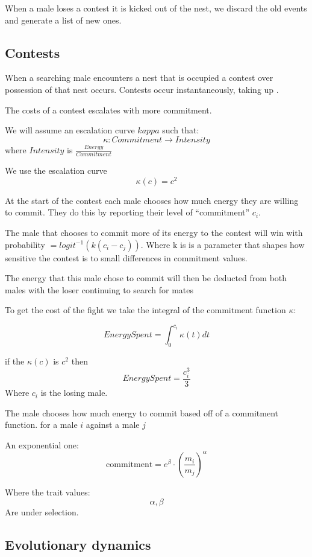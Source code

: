 \documentclass[a4paper,11pt]{article}
\begin{document}
When a male loses a contest it is kicked out of the nest, we discard the old events and generate a list of new ones.

\clearpage

\subsection{Contests}
When a searching male encounters a nest that is occupied a contest over possession of that nest occurs. Contests occur instantaneously, taking up .

The costs of a contest escalates with more commitment.

We will assume an escalation curve $kappa$ such that:
$$\kappa : Commitment \rightarrow Intensity$$
where $Intensity$ is $\frac{Energy}{Commitment}$

We use the escalation curve $$ \kappa (c) = c^2 $$

At the start of the contest each male chooses how much  energy they are willing to commit.
They do this by reporting their level of ``commitment'' $c_i$.

The male that chooses to commit more of its energy to the contest will win with probability $= logit^{-1}(k(c_i - c_j))$. Where k is is a parameter that shapes how sensitive the contest is to small differences in commitment values. 

The energy that this male chose to commit will then be deducted from both males with the loser continuing to search for mates

To get the cost of the fight we take the integral of the commitment function $\kappa$:

$$Energy Spent = \int_0^{c_i}{\kappa(t)}dt $$

if the $\kappa(c)$ is $c^2$ then
$$EnergySpent = \frac{c_i^3}{3}$$
Where $c_i$ is the losing male.


The male chooses how much energy to commit based off of a commitment function. for a male $i$ against a male $j$

An exponential one:
$$\mathrm{commitment} = e^\beta \cdot (\frac{m_i}{m_j})^\alpha $$

Where the trait values:
$$\alpha , \beta$$
Are under selection.


\clearpage

\subsection{Evolutionary dynamics}
\end{document}
